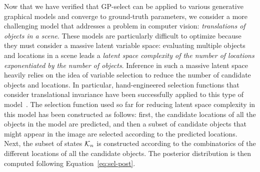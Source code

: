 Now that we have verified that GP-select can be applied to various generative graphical models and converge to ground-truth parameters, we consider a more challenging model that addresses a problem in computer vision: \emph{translations of objects in a scene}.
%
These models are particularly difficult to optimize because they must consider a massive latent variable space: evaluating multiple objects and locations in a scene leads a \textit{latent space complexity of the number of locations exponentiated by the number of objects}.
Inference in such a massive latent space heavily relies on the idea of variable selection to reduce the number of candidate objects and locations. In particular, hand-engineered selection functions that consider translational invariance have been successfully applied to this type of model~\citep{DaiLucke2012b,DaiLucke2014,DaiEtAl2013}.
%
The selection function used so far for reducing latent space complexity in this model has been constructed as follows: first, the candidate locations of all the objects in the model are predicted, and then a subset of candidate objects that might appear in the image are selected according to the predicted locations.  Next, the subset of states $\mathcal{K}_{n}$ is constructed according to the combinatorics of the different locations of all the candidate objects.
The posterior distribution is then computed following Equation~\eqref{eq:sel-post}.

